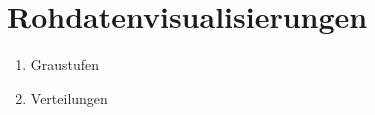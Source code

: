 \documentclass[12pt,a4paper, oneside]{scrreprt}
\begin{document}


\chapter{Rohdatenvisualisierungen}
\begin{enumerate}
      \item Graustufen
      \item Verteilungen
\end{enumerate}
\end{document}
